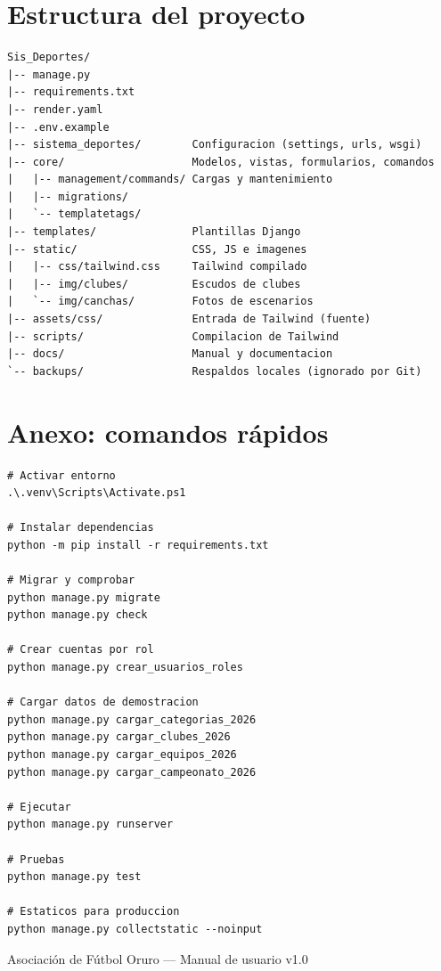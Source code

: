 \documentclass[11pt,a4paper]{article}
\begin{document}
\section{Estructura del proyecto}

\begin{verbatim}
Sis_Deportes/
|-- manage.py
|-- requirements.txt
|-- render.yaml
|-- .env.example
|-- sistema_deportes/        Configuracion (settings, urls, wsgi)
|-- core/                    Modelos, vistas, formularios, comandos
|   |-- management/commands/ Cargas y mantenimiento
|   |-- migrations/
|   `-- templatetags/
|-- templates/               Plantillas Django
|-- static/                  CSS, JS e imagenes
|   |-- css/tailwind.css     Tailwind compilado
|   |-- img/clubes/          Escudos de clubes
|   `-- img/canchas/         Fotos de escenarios
|-- assets/css/              Entrada de Tailwind (fuente)
|-- scripts/                 Compilacion de Tailwind
|-- docs/                    Manual y documentacion
`-- backups/                 Respaldos locales (ignorado por Git)
\end{verbatim}

\section*{Anexo: comandos rápidos}

\begin{lstlisting}
# Activar entorno
.\.venv\Scripts\Activate.ps1

# Instalar dependencias
python -m pip install -r requirements.txt

# Migrar y comprobar
python manage.py migrate
python manage.py check

# Crear cuentas por rol
python manage.py crear_usuarios_roles

# Cargar datos de demostracion
python manage.py cargar_categorias_2026
python manage.py cargar_clubes_2026
python manage.py cargar_equipos_2026
python manage.py cargar_campeonato_2026

# Ejecutar
python manage.py runserver

# Pruebas
python manage.py test

# Estaticos para produccion
python manage.py collectstatic --noinput
\end{lstlisting}

\vfill
\begin{center}
\small\color{afoGris}
Asociación de Fútbol Oruro --- Manual de usuario v1.0
\end{center}
\end{document}
